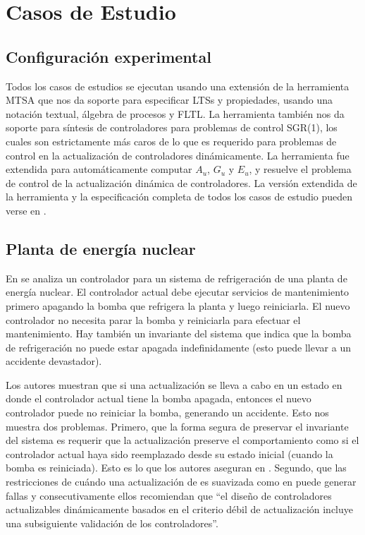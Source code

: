 \section{Casos de Estudio}
\label{cases_of_study}

\subsection*{Configuración experimental}

Todos los casos de estudios se ejecutan usando una extensión de la herramienta MTSA \cite{4639371} que nos da soporte
para especificar LTSs y propiedades, usando una notación textual, álgebra de procesos y FLTL. La herramienta también nos 
da soporte para síntesis de controladores para problemas de control SGR(1), los cuales son estrictamente más caros de lo
que es requerido para problemas de control en la actualización de controladores dinámicamente. La herramienta fue 
extendida para automáticamente computar $A_u$, $G_u$ y $E_u$, y resuelve el problema de control de la actualización
dinámica de controladores. La versión extendida de la herramienta y la especificación completa de todos los casos de
estudio pueden verse en \cite{}.

\subsection{Planta de energía nuclear}
\label{power_plant}

En \cite{PanzicaLaManna:2013:FCC:2487336.2487349} se analiza un controlador para un sistema de refrigeración de una
planta de energía nuclear. El controlador actual debe ejecutar servicios de mantenimiento primero apagando la
bomba que refrigera la planta y luego reiniciarla. El nuevo controlador no necesita parar la bomba y reiniciarla para
efectuar el mantenimiento. Hay también un invariante del sistema que indica que la bomba de refrigeración no puede estar
apagada indefinidamente (esto puede llevar a un accidente devastador). 

Los autores muestran que si una actualización se lleva a cabo en un estado en donde el controlador actual tiene la bomba
apagada, entonces el nuevo controlador puede no reiniciar la bomba, generando un accidente. Esto nos muestra dos
problemas. Primero, que la forma segura de preservar el invariante del sistema es requerir que la actualización preserve
el comportamiento como si el controlador actual haya sido reemplazado desde su estado inicial (cuando la bomba es
reiniciada). Esto es lo que los autores aseguran en \cite{6224401}. Segundo, que las restricciones de cuándo una
actualización de \cite{6224401} es suavizada como en \cite{PanzicaLaManna:2013:FCC:2487336.2487349}  puede generar
fallas y consecutivamente ellos recomiendan que ``el diseño de controladores actualizables dinámicamente basados en el
criterio débil de  actualización incluye una subsiguiente validación de los controladores''.

